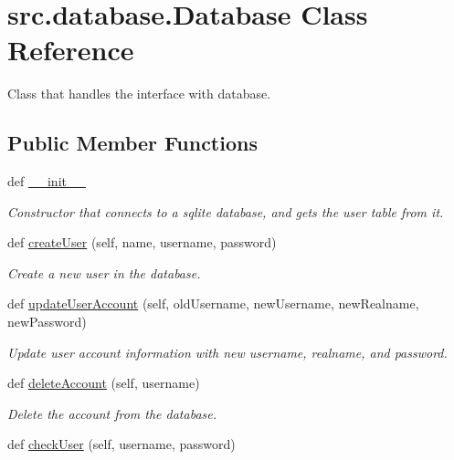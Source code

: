 \hypertarget{classsrc_1_1database_1_1_database}{}\section{src.\+database.\+Database Class Reference}
\label{classsrc_1_1database_1_1_database}


Class that handles the interface with database.  


\subsection*{Public Member Functions}
\begin{DoxyCompactItemize}
\item 
def \hyperlink{classsrc_1_1database_1_1_database_aab829b3386356e12ed7276c63e168269}{\+\_\+\+\_\+init\+\_\+\+\_\+}
\begin{DoxyCompactList}\small\item\em Constructor that connects to a sqlite database, and gets the \textquotesingle{}user\textquotesingle{} table from it. \end{DoxyCompactList}\item 
def \hyperlink{classsrc_1_1database_1_1_database_a9f2df42cc938c2eb8186104b2831afaa}{create\+User} (self, name, username, password)
\begin{DoxyCompactList}\small\item\em Create a new user in the database. \end{DoxyCompactList}\item 
def \hyperlink{classsrc_1_1database_1_1_database_a374cf7a2b0dc2d1764fea49ef248544c}{update\+User\+Account} (self, old\+Username, new\+Username, new\+Realname, new\+Password)
\begin{DoxyCompactList}\small\item\em Update user account information with new username, realname, and password. \end{DoxyCompactList}\item 
def \hyperlink{classsrc_1_1database_1_1_database_ab38097adf50de7cdc08953819dc59d91}{delete\+Account} (self, username)
\begin{DoxyCompactList}\small\item\em Delete the account from the database. \end{DoxyCompactList}\item 
def \hyperlink{classsrc_1_1database_1_1_database_a801015f444b4267274d219381e134575}{check\+User} (self, username, password)

\end{DoxyCompactItemize}
